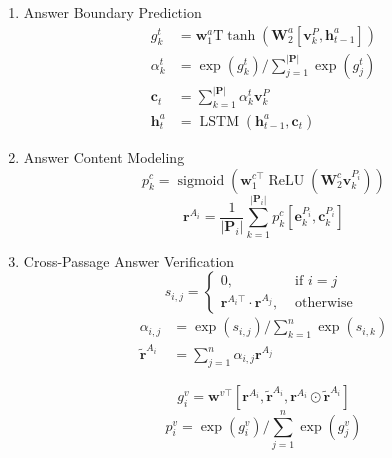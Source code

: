 \documentclass[a4paper,UTF8]{article}
\numberwithin{equation}{section}
\begin{document}
\begin{enumerate}
	\item Answer Boundary Prediction
	\begin{equation}
	\begin{aligned} g_{k}^{t} &=\mathbf{w}_{1}^{a} \mathrm{T} \tanh \left(\mathbf{W}_{2}^{a}\left[\mathbf{v}_{k}^{P}, \mathbf{h}_{t-1}^{a}\right]\right) \\ \alpha_{k}^{t} &=\exp \left(g_{k}^{t}\right) / \sum_{j=1}^{|\mathbf{P}|} \exp \left(g_{j}^{t}\right) \\ \mathbf{c}_{t} &=\sum_{k=1}^{|\mathbf{P}|} \alpha_{k}^{t} \mathbf{v}_{k}^{P} \\ \mathbf{h}_{t}^{a} &=\operatorname{LSTM}\left(\mathbf{h}_{t-1}^{a}, \mathbf{c}_{t}\right) \end{aligned}
	\end{equation}
	\item Answer Content Modeling
	\begin{equation}
		p_{k}^{c}=\operatorname{sigmoid}\left(\mathbf{w}_{1}^{c \top} \operatorname{ReLU}\left(\mathbf{W}_{2}^{c} \mathbf{v}_{k}^{P_{i}}\right)\right)
		\end{equation}
		\begin{equation}
			\mathbf{r}^{A_{i}}=\frac{1}{\left|\mathbf{P}_{i}\right|} \sum_{k=1}^{\left|\mathbf{P}_{i}\right|} p_{k}^{c}\left[\mathbf{e}_{k}^{P_{i}}, \mathbf{c}_{k}^{P_{i}}\right]
			\end{equation}
	\item Cross-Passage Answer Verification
	\begin{equation}
	s_{i, j}=\left\{\begin{array}{ll}{0,} & {\text { if } i=j} \\ {\mathbf{r}^{A_{i} \top} \cdot \mathbf{r}^{A_{j}},} & {\text { otherwise }}\end{array}\right.
	\end{equation}
	\begin{equation}
	\begin{aligned} \alpha_{i, j} &=\exp \left(s_{i, j}\right) / \sum_{k=1}^{n} \exp \left(s_{i, k}\right) \\ \tilde{\mathbf{r}}^{A_{i}} &=\sum_{j=1}^{n} \alpha_{i, j} \mathbf{r}^{A_{j}} \end{aligned}
	\end{equation}

	\begin{equation}
		g_{i}^{v}=\mathbf{w}^{v \top}\left[\mathbf{r}^{A_{i}}, \tilde{\mathbf{r}}^{A_{i}}, \mathbf{r}^{A_{i}} \odot \tilde{\mathbf{r}}^{A_{i}}\right]
		\end{equation}
		\begin{equation}
			p_{i}^{v}=\exp \left(g_{i}^{v}\right) / \sum_{j=1}^{n} \exp \left(g_{j}^{v}\right)
			\end{equation}
\end{enumerate}
\end{document}
